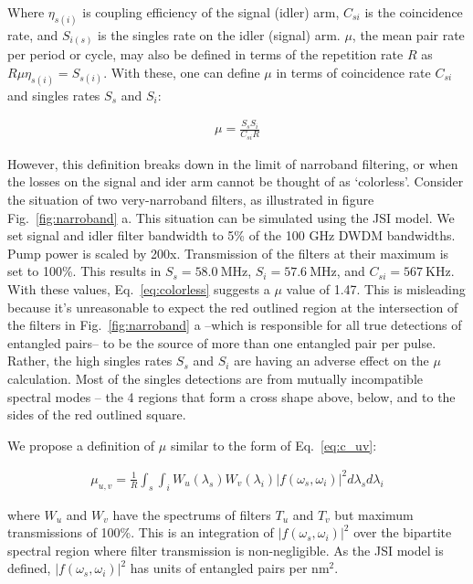\documentclass[11pt]{caltech_thesis} %
\begin{document}
Where $\eta_{s(i)}$ is coupling efficiency of the signal (idler) arm, $C_{s i}$ is the coincidence rate, and $S_{i(s)}$ is the singles rate on the idler (signal) arm. $\mu$, the mean pair rate per period or cycle, may also be defined in terms of the repetition rate $R$ as $R \mu \eta_{s(i)}=S_{s(i)}$. With these, one can define $\mu$ in terms of coincidence rate $C_{s i}$ and singles rates $S_s$ and $S_i$:

\hypertarget{eq:colorless}{}{
\begin{align}
    \mu=\frac{S_s S_i}{C_{s i} R} \label{eq:colorless}
\end{align}
}

However, this definition breaks down in the limit of narroband filtering, or when the losses on the signal and ider arm cannot be thought of as `colorless'. Consider the situation of two very-narroband filters, as illustrated in figure Fig.~\ref{fig:narroband} a. This situation can be simulated using the JSI model. We set signal and idler filter bandwidth to 5\% of the 100 GHz DWDM bandwidths. Pump power is scaled by 200x. Transmission of the filters at their maximum is set to 100\%. This results in $S_s = 58.0~\mathrm{MHz}$, $S_i = 57.6~\mathrm{MHz}$, and $C_{s i} = 567~\mathrm{KHz}$. With these values, Eq.~\ref{eq:colorless} suggests a $\mu$ value of 1.47. This is misleading because it's unreasonable to expect the red outlined region at the intersection of the filters in Fig.~\ref{fig:narroband} a --which is responsible for all true detections of entangled pairs-- to be the source of more than one entangled pair per pulse. Rather, the high singles rates $S_s$ and $S_i$ are having an adverse effect on the $\mu$ calculation. Most of the singles detections are from mutually incompatible spectral modes -- the 4 regions that form a cross shape above, below, and to the sides of the red outlined square.

We propose a definition of $\mu$ similar to the form of Eq.~\ref{eq:c_uv}:

\hypertarget{eq:newmu}{}{
\begin{align}
    \mu_{u,v} = \frac{1}{R}\int_{s}\int_{i}W_u(\lambda_s)W_v(\lambda_i)|f(\omega_s, \omega_i)|^2 d\lambda_s d\lambda_i \label{eq:newmu}
\end{align}
}

where $W_u$ and $W_v$ have the spectrums of filters $T_u$ and $T_v$ but maximum transmissions of 100\%. This is an integration of $|f(\omega_s, \omega_i)|^2$ over the bipartite spectral region where filter transmission is non-negligible. As the JSI model is defined, $|f(\omega_s, \omega_i)|^2$ has units of entangled pairs per $\mathrm{nm}^2$.
\end{document}
